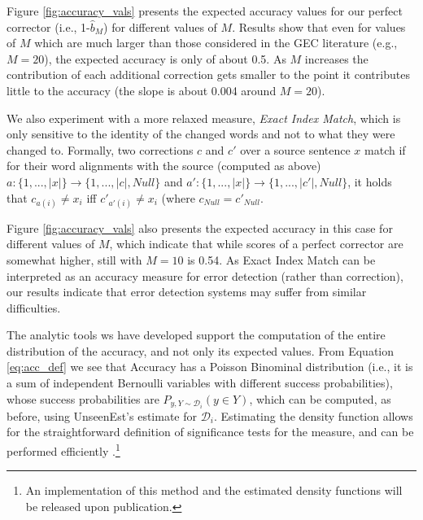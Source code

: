 \documentclass[letterpaper, 11pt]{article}
\newcommand{\lc}[1]{\footnote{\color{blue}LC: #1}}
\begin{document}
Figure \ref{fig:accuracy_vals} presents the expected accuracy values for our perfect
corrector (i.e., 1-$\hat{b}_M$) for different values of $M$. 
Results show that even for values of $M$ which are much larger than those considered in the GEC literature (e.g., $M=20$),
the expected accuracy is only of about 0.5. As $M$ increases the contribution of each additional correction
  gets smaller to the point it contributes little to the accuracy (the slope is about 0.004 around $M=20$).

We also experiment with a more relaxed measure, {\it Exact Index Match}, which is only sensitive
to the identity of the changed words and not to what they were changed to. 
Formally, two corrections $c$ and $c'$ over a source sentence $x$ match
if for their word alignments with the source (computed as above) $a:\{1,...,\left|x\right|\} \rightarrow \{1,...,\left|c\right|,Null\}$
and $a':\{1,...,\left|x\right|\} \rightarrow \{1,...,\left|c'\right|,Null\}$, it holds that $c_{a\left(i\right)} \neq x_{i}$ iff $c'_{a'\left(i\right)} \neq x_{i}$ (where $c_{Null}=c'_{Null}$.

Figure \ref{fig:accuracy_vals} also presents the expected accuracy in this case
for different values of $M$, which indicate that while scores of a perfect corrector are somewhat higher,
still with $M=10$ is 0.54.
As Exact Index Match can be interpreted as an accuracy measure for error detection (rather than correction),
our results indicate that error detection systems may suffer from similar difficulties.
%

The analytic tools ws have developed support the computation of the entire distribution of the accuracy,
and not only its expected values. From Equation \ref{eq:acc_def} we see that Accuracy has a Poisson Binominal distribution (i.e., it is a sum of independent Bernoulli variables with different success probabilities), whose success probabilities are $P_{y,Y \sim \mathcal{D}_i}(y \in Y)$, which can be computed, as before, using {\sc UnseenEst}'s estimate for $\mathcal{D}_i$. Estimating the density function allows for the straightforward definition of significance tests for the measure, and can be performed efficiently \cite{hong2013computing}.\footnote{An implementation of this method and the estimated density functions will be released upon publication.}
\end{document}

